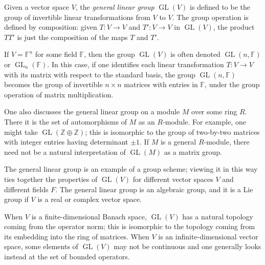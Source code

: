 \documentclass[12pt]{article}
\newcommand{\GL}{{\operatorname{GL}}}
\begin{document}
Given a vector space $V$, the {\em general linear group} $\GL(V)$ is defined to be the group of invertible linear transformations from $V$ to $V$. The group operation is defined by composition: given $T: V \longrightarrow V$ and $T': V \longrightarrow V$ in $\GL(V)$, the product $TT'$ is just the composition of the maps $T$ and $T'$.

If $V = \mathbb{F}^n$ for some field $\mathbb{F}$, then the group $\GL(V)$ is often denoted $\GL(n,\mathbb{F})$ or $\GL_n(\mathbb{F})$. In this case, if one identifies each linear transformation $T: V \longrightarrow V$ with its matrix with respect to the standard basis, the group $\GL(n,\mathbb{F})$ becomes the group of invertible $n \times n$ matrices with entries in $\mathbb{F}$, under the group operation of matrix multiplication.

One also discusses the general linear group on a module $M$ over some ring $R$.  There it is the set of automorphisms of $M$ as an $R$-module.  For example, one might take $\GL(\mathbb{Z}\oplus\mathbb{Z})$; this is isomorphic to the group of two-by-two matrices with integer entries having determinant $\pm 1$.  If $M$ is a general $R$-module, there need not be a natural interpretation of $\GL(M)$ as a matrix group.

The general linear group is an example of a group scheme; viewing it in this way ties together the properties of $\GL(V)$ for different vector spaces $V$ and different fields $F$.  The general linear group is an algebraic group, and it is a Lie group if $V$ is a real or complex vector space. 

When $V$ is a finite-dimensional Banach space, $\GL(V)$ has a natural topology coming from the operator norm; this is isomorphic to the topology coming from its embedding into the ring of matrices.  When $V$ is an infinite-dimensional vector space, some elements of $\GL(V)$ may not be continuous and one generally looks instead at the set of bounded operators.
\end{document}
